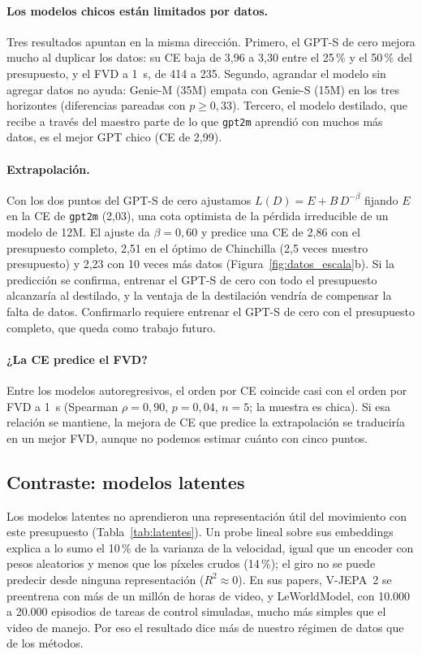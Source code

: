 \documentclass[10pt,twocolumn,a4paper]{article}
\DeclareRobustCommand{\editado}[1]{\textcolor{editado}{#1}}
\DeclareRobustCommand{\editado}[1]{#1}
\begin{document}
\paragraph{Los modelos chicos están limitados por datos.} Tres resultados apuntan en la misma dirección. Primero, el GPT-S de cero mejora mucho al duplicar los datos: su CE baja de 3,96 a 3,30 entre el 25\,\% y el 50\,\% del presupuesto, y el FVD a 1~s, de 414 a 235. Segundo, agrandar el modelo sin agregar datos no ayuda: Genie-M (35M) empata con Genie-S (15M) en los tres horizontes (diferencias pareadas con $p\geq0{,}33$). Tercero, el modelo destilado, que recibe a través del maestro parte de lo que \texttt{gpt2m} aprendió con muchos más datos, es el mejor GPT chico (CE de 2,99).

\paragraph{Extrapolación.} Con los dos puntos del GPT-S de cero ajustamos $L(D)=E+B\,D^{-\beta}$ fijando $E$ en la CE de \texttt{gpt2m} (2,03), una cota optimista de la pérdida irreducible de un modelo de 12M. El ajuste da $\beta=0{,}60$ y predice una CE de 2,86 con el presupuesto completo, 2,51 en el óptimo de Chinchilla (2,5 veces nuestro presupuesto) y 2,23 con 10 veces más datos (Figura~\ref{fig:datos_escala}b). Si la predicción se confirma, entrenar el GPT-S de cero con todo el presupuesto alcanzaría al destilado, y la ventaja de la destilación vendría de compensar la falta de datos. \editado{Confirmarlo requiere entrenar el GPT-S de cero con el presupuesto completo, que queda como trabajo futuro.}

\paragraph{¿La CE predice el FVD?} Entre los modelos autoregresivos, el orden por CE coincide casi con el orden por FVD a 1~s (Spearman $\rho=0{,}90$, $p=0{,}04$, $n=5$; la muestra es chica). Si esa relación se mantiene, la mejora de CE que predice la extrapolación se traduciría en un mejor FVD, aunque no podemos estimar cuánto con cinco puntos.

\subsection{Contraste: modelos latentes}
\label{sec:latentes}

Los modelos latentes no aprendieron una representación útil del movimiento con este presupuesto (Tabla~\ref{tab:latentes}). Un probe lineal sobre sus embeddings explica a lo sumo el 10\,\% de la varianza de la velocidad, igual que un encoder con pesos aleatorios y menos que los píxeles crudos (14\,\%); el giro no se puede predecir desde ninguna representación ($R^2\approx0$). \editado{En sus papers, V-JEPA~2 se preentrena con más de un millón de horas de video, y LeWorldModel, con 10.000 a 20.000 episodios de tareas de control simuladas, mucho más simples que el video de manejo. Por eso el resultado dice más de nuestro régimen de datos que de los métodos.}
\end{document}
